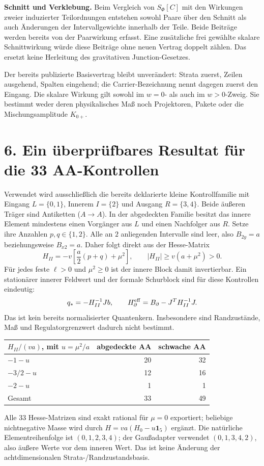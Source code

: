 \documentclass[10pt,a4paper]{article}
\newcommand{\sect}[1]{\section*{\color{navy}#1}}
\begin{document}
\textbf{Schnitt und Verklebung.}
Beim Vergleich von $S_\Phi[C]$ mit den Wirkungen zweier induzierter
Teilordnungen entstehen sowohl Paare über den Schnitt als auch Änderungen
der Intervallgewichte innerhalb der Teile. Beide Beiträge werden bereits
von der Paarwirkung erfasst. Eine zusätzliche frei gewählte skalare
Schnittwirkung würde diese Beiträge ohne neuen Vertrag doppelt zählen.
Das ersetzt keine Herleitung des gravitativen Junction-Gesetzes.

Der bereits publizierte Basisvertrag bleibt unverändert:
Strata zuerst, Zeilen ausgehend, Spalten eingehend; die Carrier-Bezeichnung
nennt dagegen zuerst den Eingang. Die skalare Wirkung gilt sowohl im
$w=0$- als auch im $w>0$-Zweig. Sie bestimmt weder deren physikalisches
Maß noch Projektoren, Pakete oder die Mischungsamplitude $K_{0+}$.

\newpage
\sect{6. Ein überprüfbares Resultat für die 33 AA-Kontrollen}
Verwendet wird ausschließlich die bereits deklarierte kleine
Kontrollfamilie mit Eingang $L=\{0,1\}$, Innerem $I=\{2\}$ und Ausgang
$R=\{3,4\}$. Beide äußeren Träger sind Antiketten ($A\to A$).
In der abgedeckten Familie besitzt das innere Element mindestens einen
Vorgänger aus $L$ und einen Nachfolger aus $R$. Setze ihre Anzahlen
$p,q\in\{1,2\}$. Alle an $2$ anliegenden Intervalle sind leer, also
$B_{2y}=a$ beziehungsweise $B_{x2}=a$. Daher folgt direkt aus der Hesse-Matrix
\[
\boxed{H_{II}=-v\left[\frac a2(p+q)+\mu^2\right],\qquad
|H_{II}|\geq v(a+\mu^2)>0.}
\]
Für jedes feste $\ell>0$ und $\mu^2\geq0$ ist der innere Block damit
invertierbar. Ein stationärer innerer Feldwert und der formale Schurblock
sind für diese Kontrollen eindeutig:
\[
q_*=-H_{II}^{-1}Jb,\qquad
H_\partial^{\rm eff}=B_\partial-J^TH_{II}^{-1}J.
\]
Das ist kein bereits normalisierter Quantenkern. Insbesondere sind
Randzustände, Maß und Regulatorgrenzwert dadurch nicht bestimmt.

\begin{center}
\begin{tabular}{lrr}
\toprule
$H_{II}/(va)$, mit $u=\mu^2/a$ & abgedeckte AA & schwache AA\\\midrule
$-1-u$ & 20 & 32\\
$-3/2-u$ & 12 & 16\\
$-2-u$ & 1 & 1\\\midrule
Gesamt & 33 & 49\\\bottomrule
\end{tabular}
\end{center}
Alle 33 Hesse-Matrizen sind exakt rational für $\mu=0$ exportiert;
beliebige nichtnegative Masse wird durch
$H=va(H_0-u\mathbf1_5)$ ergänzt. Die natürliche Elementreihenfolge ist
$(0,1,2,3,4)$; der Gaußadapter verwendet $(0,1,3,4,2)$, also äußere Werte
vor dem inneren Wert. Das ist keine Änderung der achtdimensionalen
Strata-/Randzustandsbasis.
\end{document}
